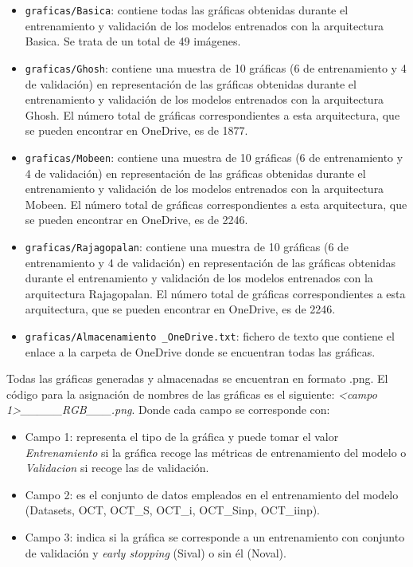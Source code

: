 \begin{itemize}
\begin{itemize}
        \item \texttt{graficas/Basica}: contiene todas las gráficas obtenidas durante el entrenamiento y validación de los modelos entrenados con la arquitectura Basica. Se trata de un total de 49 imágenes.
        \item \texttt{graficas/Ghosh}: contiene una muestra de 10 gráficas (6 de entrenamiento y 4 de validación) en representación de las gráficas obtenidas durante el entrenamiento y validación de los modelos entrenados con la arquitectura Ghosh. El número total de gráficas correspondientes a esta arquitectura, que se pueden encontrar en OneDrive, es de 1877.
        \item \texttt{graficas/Mobeen}: contiene una muestra de 10 gráficas (6 de entrenamiento y 4 de validación) en representación de las gráficas obtenidas durante el entrenamiento y validación de los modelos entrenados con la arquitectura Mobeen. El número total de gráficas correspondientes a esta arquitectura, que se pueden encontrar en OneDrive, es de 2246.
        \item \texttt{graficas/Rajagopalan}: contiene una muestra de 10 gráficas (6 de entrenamiento y 4 de validación) en representación de las gráficas obtenidas durante el entrenamiento y validación de los modelos entrenados con la arquitectura Rajagopalan. El número total de gráficas correspondientes a esta arquitectura, que se pueden encontrar en OneDrive, es de 2246.
        \item \texttt{graficas/Almacenamiento \_OneDrive.txt}: fichero de texto que contiene el enlace a la carpeta de OneDrive donde se encuentran todas las gráficas.
    \end{itemize}
    Todas las gráficas generadas y almacenadas se encuentran en formato .png. El código para la asignación de nombres de las gráficas es el siguiente: \textit{<campo 1>\_<campo 2>\_<campo 3>\_<campo 4>\_<campo 5>\_RGB\_<campo 6>\_<campo 7>\_<campo 8>.png}. Donde cada campo se corresponde con:
    \begin{itemize}
        \item Campo 1: representa el tipo de la gráfica y puede tomar el valor \textit{Entrenamiento} si la gráfica recoge las métricas de entrenamiento del modelo o \textit{Validacion} si recoge las de validación.
        \item Campo 2: es el conjunto de datos empleados en el entrenamiento del modelo (Datasets, OCT, OCT\_S, OCT\_i, OCT\_Sinp, OCT\_iinp).
        \item Campo 3: indica si la gráfica se corresponde a un entrenamiento con conjunto de validación y \textit{early stopping} (Sival) o sin él (Noval).

\end{itemize}
\end{itemize}
